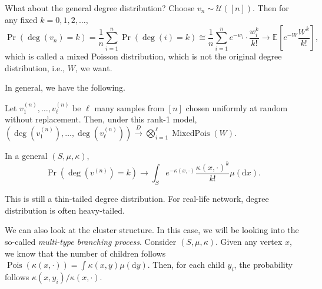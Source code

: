 What about the general degree distribution? Choose \(v_n \sim \mathcal{U} ([n])\). Then for any fixed \(k=0, 1, 2, \dots \),
\[
	\Pr_{}\left(\deg (v_n) = k\right)
	= \frac{1}{n} \sum_{i=1}^{n} \Pr_{}\left(\deg (i) = k\right)
	\cong \frac{1}{n} \sum_{i=1}^{n} e^{-w_i} \cdot \frac{w_i^k}{k!}
	\to \mathbb{E}_{}\left[ e^{-W} \frac{W^k}{k!} \right] ,
\]
which is called a mixed Poisson distribution, which is not the original degree distribution, i.e., \(W\), we want.

In general, we have the following.

\begin{theorem}
	Let \(v_1^{(n)}, \dots , v_{\ell }^{(n)} \) be \(\ell \) many samples from \([n]\) chosen uniformly at random without replacement. Then, under this rank-1 model, \((\deg (v_1^{(n)}), \dots , \deg (v_{\ell } ^{(n)})) \overset{D}{\to} \bigotimes _{i=1}^{\ell} \operatorname{MixedPois}(W) \).
\end{theorem}

In a general \((S, \mu , \kappa )\),
\[
	\Pr_{}\left(\deg (v^{(n)}) = k\right)
	\to \int _S e^{-\kappa (x, \cdot)} \frac{\kappa (x, \cdot)^k}{k!} \mu (\mathrm{d} x).
\]
\begin{remark}
	This is still a thin-tailed degree distribution. For real-life network, degree distribution is often heavy-tailed.
\end{remark}

We can also look at the cluster structure. In this case, we will be looking into the so-called \emph{multi-type branching process}. Consider \((S, \mu , \kappa )\). Given any vertex \(x\), we know that the number of children follows \(\operatorname{Pois}(\kappa (x, \cdot)) = \int \kappa (x, y) \mu (\mathrm{d} y)\). Then, for each child \(y_i\), the probability follows \(\kappa (x, y_i) / \kappa (x, \cdot)\).

